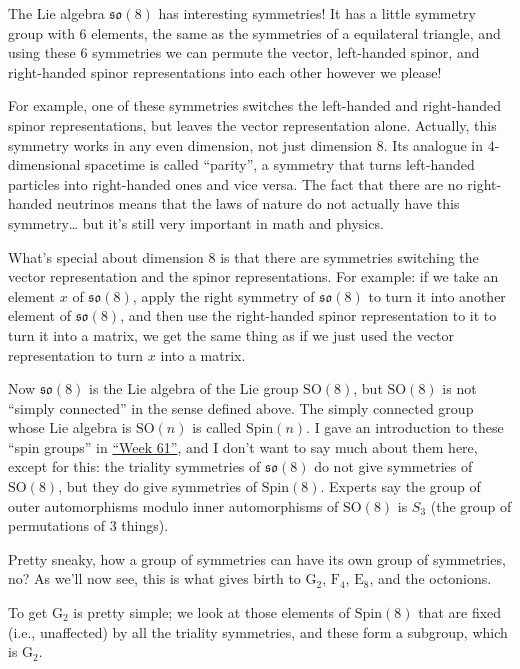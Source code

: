 \documentclass{article}
\begin{document}
The Lie algebra \(\mathfrak{so}(8)\) has interesting symmetries! It has
a little symmetry group with 6 elements, the same as the symmetries of a
equilateral triangle, and using these 6 symmetries we can permute the
vector, left-handed spinor, and right-handed spinor representations into
each other however we please!

For example, one of these symmetries switches the left-handed and
right-handed spinor representations, but leaves the vector
representation alone. Actually, this symmetry works in any even
dimension, not just dimension 8. Its analogue in \(4\)-dimensional
spacetime is called ``parity'', a symmetry that turns left-handed
particles into right-handed ones and vice versa. The fact that there are
no right-handed neutrinos means that the laws of nature do not actually
have this symmetry\ldots{} but it's still very important in math and
physics.

What's special about dimension 8 is that there are symmetries switching
the vector representation and the spinor representations. For example:
if we take an element \(x\) of \(\mathfrak{so}(8)\), apply the right
symmetry of \(\mathfrak{so}(8)\) to turn it into another element of
\(\mathfrak{so}(8)\), and then use the right-handed spinor
representation to it to turn it into a matrix, we get the same thing as
if we just used the vector representation to turn \(x\) into a matrix.

Now \(\mathfrak{so}(8)\) is the Lie algebra of the Lie group
\(\mathrm{SO}(8)\), but \(\mathrm{SO}(8)\) is not ``simply connected''
in the sense defined above. The simply connected group whose Lie algebra
is \(\mathrm{SO}(n)\) is called \(\mathrm{Spin}(n)\). I gave an
introduction to these ``spin groups'' in
\protect\hyperlink{week61}{``Week 61''}, and I don't want to say much
about them here, except for this: the triality symmetries of
\(\mathfrak{so}(8)\) do not give symmetries of \(\mathrm{SO}(8)\), but
they do give symmetries of \(\mathrm{Spin}(8)\). Experts say the group
of outer automorphisms modulo inner automorphisms of \(\mathrm{SO}(8)\)
is \(S_3\) (the group of permutations of 3 things).

Pretty sneaky, how a group of symmetries can have its own group of
symmetries, no? As we'll now see, this is what gives birth to
\(\mathrm{G}_2\), \(\mathrm{F}_4\), \(\mathrm{E}_8\), and the octonions.

To get \(\mathrm{G}_2\) is pretty simple; we look at those elements of
\(\mathrm{Spin}(8)\) that are fixed (i.e., unaffected) by all the
triality symmetries, and these form a subgroup, which is
\(\mathrm{G}_2\).
\end{document}
